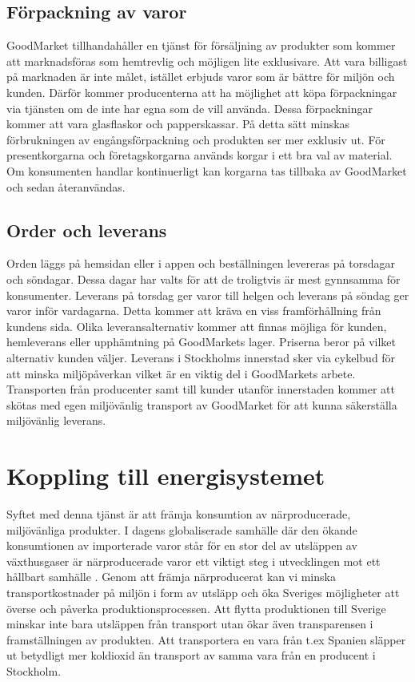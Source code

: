 \documentclass[10pt,a4paper,oneside]{article}
\begin{document}
\subsection{Förpackning av varor}
GoodMarket tillhandahåller en tjänst för försäljning av produkter som kommer att marknadsföras som hemtrevlig och möjligen lite exklusivare. Att vara billigast på marknaden är inte målet, istället erbjuds varor som är bättre för miljön och kunden. Därför kommer producenterna att ha möjlighet att köpa förpackningar via tjänsten om de inte har egna som de vill använda. Dessa förpackningar kommer att vara glasflaskor och papperskassar. På detta sätt minskas förbrukningen av engångsförpackning och produkten ser mer exklusiv ut. För presentkorgarna och företagskorgarna används korgar i ett bra val av material. Om konsumenten handlar kontinuerligt kan korgarna tas tillbaka av GoodMarket och sedan återanvändas. 

\subsection{Order och leverans}
Orden läggs på hemsidan eller i appen och beställningen levereras på torsdagar och söndagar. Dessa dagar har valts för att de troligtvis är mest gynnsamma för konsumenter. Leverans på torsdag ger varor till helgen och leverans på söndag ger varor inför vardagarna. Detta kommer att kräva en viss framförhållning från kundens sida. Olika leveransalternativ kommer att finnas möjliga för kunden, hemleverans eller upphämtning på GoodMarkets lager. Priserna beror på vilket alternativ kunden väljer. Leverans i Stockholms innerstad sker via cykelbud för att minska miljöpåverkan vilket är en viktig del i GoodMarkets arbete. Transporten från producenter samt till kunder utanför innerstaden kommer att skötas med egen miljövänlig transport av GoodMarket för att kunna säkerställa miljövänlig leverans. 
\newpage

\section{Koppling till energisystemet}

Syftet med denna tjänst är att främja konsumtion av närproducerade, miljövänliga produkter.  I dagens globaliserade samhälle där den ökande konsumtionen av importerade varor står för en stor del av utsläppen av växthusgaser är närproducerade varor ett viktigt steg i utvecklingen mot ett hållbart samhälle \cite{Naturskyddsföreningen1}. Genom att främja närproducerat kan vi minska transportkostnader på miljön i form av utsläpp och öka Sveriges möjligheter att överse och påverka produktionsprocessen. Att flytta produktionen till Sverige minskar inte bara utsläppen från transport utan ökar även transparensen i framställningen av produkten. Att transportera en vara från t.ex Spanien släpper ut betydligt mer koldioxid än transport av samma vara från en producent i Stockholm. \\  
\end{document}
